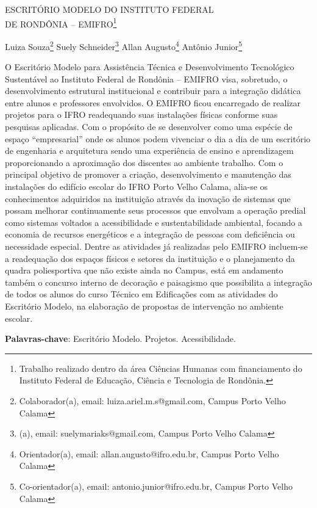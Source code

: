 \documentclass[article,12pt,onesidea,4paper,english,brazil]{abntex2}
\begin{document}
	
	
	\frenchspacing 
	
	\begin{center}
		\LARGE ESCRITÓRIO MODELO DO INSTITUTO FEDERAL\\DE RONDÔNIA -- EMIFRO\footnote{Trabalho realizado dentro da área Ciências Humanas com financiamento do Instituto Federal de Educação, Ciência e Tecnologia de Rondônia.}
		
		\normalsize
		Luiza Souza\footnote{Colaborador(a), email: luiza.ariel.m.s@gmail.com, Campus Porto Velho Calama} 
		Suely Schneider\footnote{(a), email: suelymariaks@gmail.com, Campus Porto Velho Calama} 
		Allan Augusto\footnote{Orientador(a), email: allan.augusto@ifro.edu.br, Campus Porto Velho Calama} 
		Antônio Junior\footnote{Co-orientador(a), email: antonio.junior@ifro.edu.br, Campus Porto Velho Calama} 
	\end{center}
	
	\noindent O Escritório Modelo para Assistência Técnica e Desenvolvimento Tecnológico Sustentável ao Instituto Federal de Rondônia – EMIFRO visa, sobretudo, o desenvolvimento estrutural institucional e contribuir para a integração didática entre alunos e professores envolvidos. O EMIFRO ficou encarregado de realizar projetos para o IFRO readequando suas instalações físicas conforme suas pesquisas aplicadas. Com o propósito de se desenvolver como uma espécie de espaço “empresarial” onde os alunos podem vivenciar o dia a dia de um escritório de engenharia e arquitetura sendo uma experiência de ensino e aprendizagem proporcionando a aproximação dos discentes ao ambiente trabalho. Com o principal objetivo de promover a criação, desenvolvimento e manutenção das instalações do edifício escolar do IFRO Porto Velho Calama, alia-se os conhecimentos adquiridos na instituição através da inovação de sistemas que possam melhorar continuamente seus processos que envolvam a operação predial como sistemas voltados a acessibilidade e sustentabilidade ambiental, focando a economia de recursos energéticos e a integração de pessoas com deficiência ou necessidade especial. Dentre as atividades já realizadas pelo EMIFRO incluem-se a readequação dos espaços físicos e setores da instituição e o planejamento da quadra poliesportiva que não existe ainda no Campus, está em andamento também o concurso interno de decoração e paisagismo que possibilita a integração de todos os alunos do curso Técnico em Edificações com as atividades do Escritório Modelo, na elaboração de propostas de intervenção no ambiente escolar.
	
	\vspace{\onelineskip}
	
	\noindent
	\textbf{Palavras-chave}: Escritório Modelo. Projetos. Acessibilidade.
	
\end{document}
